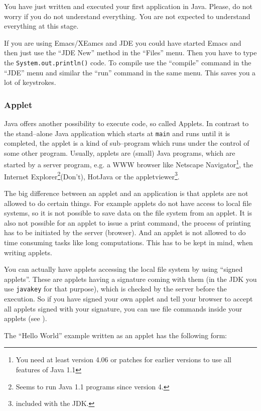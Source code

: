 You have just written and executed your first application in
Java. Please, do not worry if you do not understand everything. You are
not expected to understand everything at this stage.

If you are using Emacs/XEamcs and JDE you could have started Emacs and
then just use the ``JDE New'' method in the ``Files'' menu. Then you
have to type the \verb|System.out.println()| code. To compile
use the ``compile'' command in the ``JDE'' menu and similar
the ``run'' command in the same menu. This saves you a lot of keystrokes. 

\subsubsection{Applet}
\label{sec:Applet}

Java offers another possibility to execute code, so called Applets.
In contrast to the stand--alone Java application which starts at
\verb!main! and runs until it is completed, the applet is a kind of
sub--program which runs under the control of some other program.
Usually, applets are (small) Java programs, which are started by a 
server program,
e.g. a WWW browser like Netscape Navigator\footnote{You need at least 
version 4.06 or patches for earlier versions to use all features of Java 1.1}, 
the Internet Explorer\footnote{Seems to run Java 1.1 programs since
version 4.}(Don't),
HotJava or the appletviewer\footnote{included with the JDK.}.

The big difference between an applet and an application is that
applets are not allowed to do certain things. For example applets
do not have access to local file systems, so it is not possible
to save data on the file system from an applet. It is also not
possible for an applet to issue a print command, the process of
printing has to be initiated by the server (browser). 
And an applet is not allowed to do time consuming tasks like
long computations. This has to be kept in mind, when writing
applets.

You can actually have applets accessing the local file system by using
``signed applets''. These are applets having a signature coming
with them (in the JDK you use \verb|javakey| for that purpose), 
which is checked by the server before the execution. So
if you have signed your own applet and tell your browser to accept 
all applets signed with your signature, you can use file commands
inside your applets (see \cite[page 142]{javanutshell}).

The ``Hello World'' example written as an applet has the following form:

